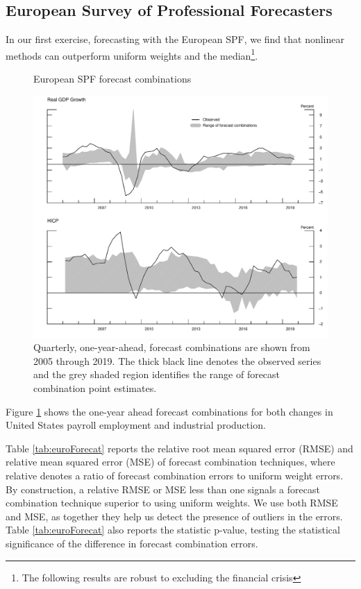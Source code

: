 \documentclass[12pt]{article}
\begin{document}
\subsection{European Survey of Professional Forecasters}
In our first exercise, forecasting with the European SPF, we find that nonlinear methods can outperform uniform weights and the median\footnote{The following results are robust to excluding the financial crisis}.

\begin{figure}[!htb]
\caption{European SPF forecast combinations}\label{fig:EuroForecasts}
\includegraphics[width = .95\textwidth]{euroForecastChart_shaded.pdf}
\caption*{Quarterly, one-year-ahead, forecast combinations are shown from 2005 through 2019. The thick black line denotes the observed series and the grey shaded region identifies the range of forecast combination point estimates.}
\end{figure}

Figure \ref{fig:EuroForecasts} shows the one-year ahead forecast combinations for both changes in United States payroll employment and industrial production. 


Table \ref{tab:euroForecat} reports the relative root mean squared error (RMSE) and relative mean squared error (MSE) of forecast combination techniques, where relative denotes a ratio of forecast combination errors to uniform weight errors. By construction, a relative RMSE or MSE less than one signals a forecast combination technique superior to using uniform weights. We use both RMSE and MSE, as together they help us detect the presence of outliers in the errors. Table \ref{tab:euroForecat} also reports the \cite{DM1995} statistic p-value, testing the statistical significance of the difference in forecast combination errors. 
\end{document}
